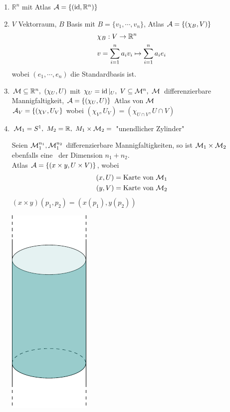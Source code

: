\begin{bsp}
\begin{enumerate}
\item$\mathbb{R}^n$ mit Atlas $\mathcal{A} = \{(\operatorname{id}, \mathbb{R}^n)\}$
\item$V$ Vektorraum, $B$ Basis mit $B = \{v_1, \cdots, v_n\}$, Atlas $\mathcal{A} = \left\{(\chi_B, V)\right\}$
\begin{align*}
& \chi_B: V \rightarrow \mathbb{R}^n\\
& v = \sum^n_{i=1} a_i v_i \mapsto \sum_{i=1}^n a_i e_i
\end{align*}
wobei $(e_1, \cdots, e_n)$ die Standardbasis ist.
\item$\mathcal{M} \subseteq \mathbb{R}^n,\ (\chi_U, U)$ mit $\chi_U = \operatorname{id}\vert_U,\ V \subseteq \mathcal{M}^n,\ \mathcal{M}$ differenzierbare Mannigfaltigkeit, $\mathcal{A} = \left\{(\chi_U, U)\right\}$ Atlas von $\mathcal{M}$\\
$\mathcal{A}_V = \left\{(\chi_V, U_V\right\}$ wobei $(\chi_V, U_V) = (\chi_{U\cap V}, U\cap V)$
\item$\mathcal{M}_1 = S^1,\ M_2 = \mathbb{R},\ M_1\times \mathcal{M}_2 =$ "unendlicher Zylinder"

\hspace{.06\textwidth}
\begin{minipage}[H]{0.8\textwidth}
Seien $\mathcal{M}_1^{n_1}, \mathcal{M}_1^{n_2}$ differenzierbare Mannigfaltigkeiten, so ist $\mathcal{M}_1\times \mathcal{M}_2$ ebenfalls eine \difM \ der Dimension $n_1 + n_2$.\\
Atlas $\mathcal{A} = \left\{(x\times y, U\times V)\right\}$, wobei 
\begin{align*}
(x, U) &= \text{Karte von } \mathcal{M}_1\\
(y, V) &= \text{Karte von } \mathcal{M}_2
\end{align*}
$(x\times y)(p_1, p_2) = (x(p_1), y(p_2))$
\end{minipage}
\hspace{1cm}
\begin{minipage}[H]{.2\textwidth}
\vspace{-1.5cm}
\includegraphics[scale=0.5]{figures/tikz/cylinder.pdf}
\end{minipage}


\end{enumerate}
\end{bsp}
